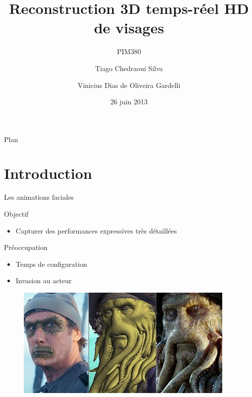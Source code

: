 \documentclass[compress,pdf,11pt,xcolor=dvipsnames]{beamer}
\title{Reconstruction 3D temps-réel HD de visages}
\subtitle{PIM380}
\author[Tiago Siva, Vinicius Gardelli]{
  Tiago Chedraoui Silva \and
  Vinicius Dias de Oliveira Gardelli\\
}
\institute{Télécom Paristech}
\date{26 juin 2013}
\begin{document}
\begin{frame}
  \titlepage
\end{frame}

\begin{frame}{Plan}
  \tableofcontents
\end{frame}

\section{Introduction}

\begin{frame}{Les animations faciales}

        \begin{block}{Objectif}
          \begin{itemize}
          \item Capturer des performances expressives très
          détaillées
          \end{itemize}
        \end{block}

        \begin{alertblock}{Préoccupation}
          \begin{itemize}
          \item Temps de configuration 
          \item Invasion au acteur 
          \end{itemize}
        \end{alertblock}

\begin{figure}
  
  \begin{columns}
    \begin{column}{0.5\textwidth}
      \includegraphics[width=\textwidth]{img/Face-Mocap}
    \end{column}
    \begin{column}{0.5\textwidth}
      

\end{column}
\end{columns}
\end{figure}
\end{frame}
\end{document}
